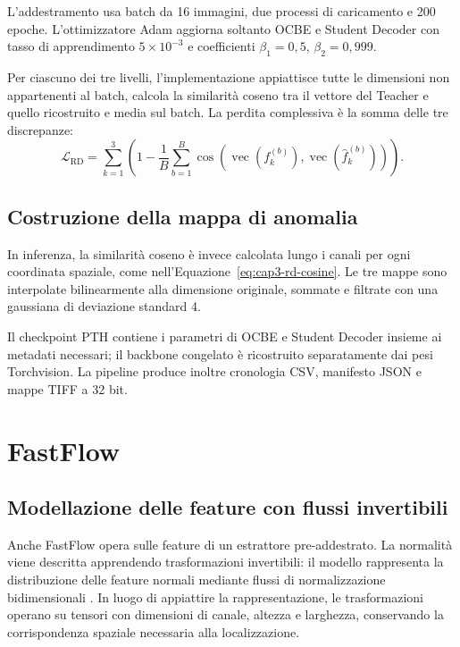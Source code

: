 L'addestramento usa batch da 16 immagini, due processi di caricamento e 200 epoche. L'ottimizzatore Adam aggiorna soltanto OCBE e Student Decoder con tasso di apprendimento $5\times10^{-3}$ e coefficienti $\beta_1=0{,}5$, $\beta_2=0{,}999$.

Per ciascuno dei tre livelli, l'implementazione appiattisce tutte le dimensioni non appartenenti al batch, calcola la similarità coseno tra il vettore del Teacher e quello ricostruito e media sul batch. La perdita complessiva è la somma delle tre discrepanze:
\begin{equation}
    \mathcal{L}_{\mathrm{RD}} =
    \sum_{k=1}^{3}\left(1-
    \frac{1}{B}\sum_{b=1}^{B}
    \cos\!\left(\operatorname{vec}(f_k^{(b)}),
    \operatorname{vec}(\widehat{f}_k^{(b)})\right)\right).
\end{equation}

\subsection{Costruzione della mappa di anomalia}

In inferenza, la similarità coseno è invece calcolata lungo i canali per ogni coordinata spaziale, come nell'Equazione~\ref{eq:cap3-rd-cosine}. Le tre mappe sono interpolate bilinearmente alla dimensione originale, sommate e filtrate con una gaussiana di deviazione standard 4.

Il checkpoint PTH contiene i parametri di OCBE e Student Decoder insieme ai metadati necessari; il backbone congelato è ricostruito separatamente dai pesi Torchvision. La pipeline produce inoltre cronologia CSV, manifesto JSON e mappe TIFF a 32 bit.

\section{FastFlow}
\label{sec:cap3-fastflow}

\subsection{Modellazione delle feature con flussi invertibili}

Anche FastFlow opera sulle feature di un estrattore pre-addestrato. La normalità viene descritta apprendendo trasformazioni invertibili: il modello rappresenta la distribuzione delle feature normali mediante flussi di normalizzazione bidimensionali \cite{Yu_et_al._2021}. In luogo di appiattire la rappresentazione, le trasformazioni operano su tensori con dimensioni di canale, altezza e larghezza, conservando la corrispondenza spaziale necessaria alla localizzazione.

